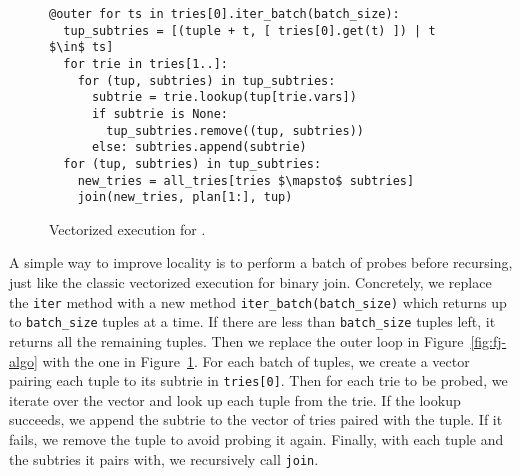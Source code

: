 \begin{figure}
  \begin{lstlisting}
@outer for ts in tries[0].iter_batch(batch_size):
  tup_subtries = [(tuple + t, [ tries[0].get(t) ]) | t $\in$ ts]
  for trie in tries[1..]:
    for (tup, subtries) in tup_subtries:
      subtrie = trie.lookup(tup[trie.vars])
      if subtrie is None:
        tup_subtries.remove((tup, subtries))
      else: subtries.append(subtrie)
  for (tup, subtries) in tup_subtries:
    new_tries = all_tries[tries $\mapsto$ subtries]
    join(new_tries, plan[1:], tup)
\end{lstlisting}
  \caption{Vectorized execution for \FJ.}
  \label{fig:vectorized-execution}
\end{figure}

A simple way to improve locality is to perform a batch of probes
before recursing, just like the classic vectorized execution
for binary join.
Concretely, we replace the \lstinline|iter| method
with a new method \lstinline|iter_batch(batch_size)|
which returns up to \lstinline|batch_size| tuples at a time.
If there are less than \lstinline|batch_size| tuples left,
it returns all the remaining tuples.
Then we replace the outer loop in Figure~\ref{fig:fj-algo}
with the one in Figure~\ref{fig:vectorized-execution}.
For each batch of tuples,
we create a vector pairing each tuple to its subtrie in
\lstinline|tries[0]|.
Then for each trie to be probed,
we iterate over the vector and look up each tuple
from the trie.
If the lookup succeeds, we append the subtrie to the vector of tries paired with the tuple.
If it fails, we remove the tuple to avoid probing it again.
Finally, with each tuple and the subtries it pairs with,
we recursively call \lstinline|join|.


